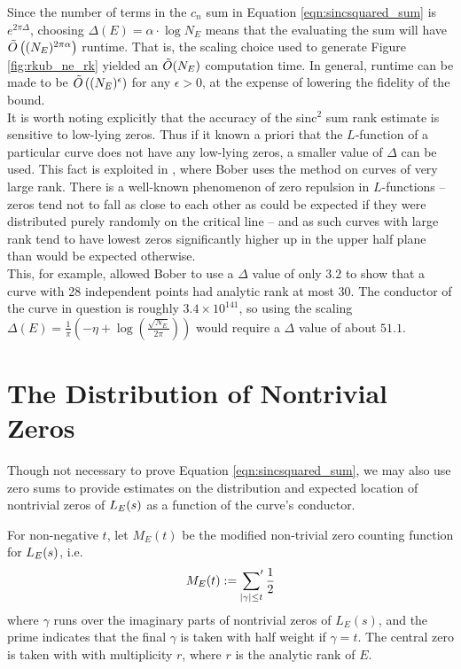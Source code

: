 Since the number of terms in the $c_n$ sum in Equation \ref{eqn:sincsquared_sum} is $e^{2\pi\Delta}$, choosing $\Delta(E) = \alpha \cdot \log N_E$ means that the evaluating the sum will have $\tilde{O}\left((N_E)^{2\pi \alpha} \right)$ runtime. That is, the scaling choice used to generate Figure \ref{fig:rkub_ne_rk} yielded an $\tilde{O}(N_E)$ computation time. In general, runtime can be made to be $\tilde{O}\left((N_E)^{\epsilon}\right)$ for any $\epsilon>0$, at the expense of lowering the fidelity of the bound. \\

It is worth noting explicitly that the accuracy of the sinc$^2$ sum rank estimate is sensitive to low-lying zeros. Thus if it known a priori that the $L$-function of a particular curve does not have any low-lying zeros, a smaller value of $\Delta$ can be used. This fact is exploited in \cite{Bob-2011}, where Bober uses the method on curves of very large rank. There is a well-known phenomenon of zero repulsion in $L$-functions -- zeros tend not to fall as close to each other as could be expected if they were distributed purely randomly on the critical line -- and as such curves with large rank tend to have lowest zeros significantly higher up in the upper half plane than would be expected otherwise. \\

This, for example, allowed Bober to use a $\Delta$ value of only $3.2$ to show that a curve with 28 independent points had analytic rank at most 30. The conductor of the curve in question is roughly $3.4\times 10^{141}$, so using the scaling $\Delta(E) = \frac{1}{\pi}\left(-\eta + \log\left(\frac{\sqrt{N_E}}{2\pi}\right)\right)$ would require a $\Delta$ value of about $51.1$.

\newpage
\section{The Distribution of Nontrivial Zeros}

Though not necessary to prove Equation \ref{eqn:sincsquared_sum}, we may also use zero sums to provide estimates on the distribution and expected location of nontrivial zeros of $L_E(s)$ as a function of the curve's conductor. \\

\begin{definition}
For non-negative $t$, let $M_E(t)$ be the modified non-trivial zero counting function for $L_E(s)$, i.e.
\begin{equation}
M_E(t) := \sideset{}{^{\prime}}\sum_{|\gamma| \le t} \frac{1}{2}
\end{equation}
where $\gamma$ runs over the imaginary parts of nontrivial zeros of $L_E(s)$, and the prime indicates that the final $\gamma$ is taken with half weight if $\gamma = t$. The central zero is taken with with multiplicity $r$, where $r$ is the analytic rank of $E$. \\
\end{definition}

